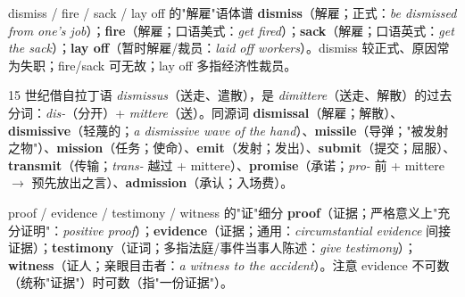 \documentclass[../main.tex]{subfiles}
\begin{document}





\begin{gram}{dismiss / fire / sack / lay off 的"解雇"语体谱}
\textbf{dismiss}（解雇；正式：\textit{be dismissed from one's job}）；\textbf{fire}（解雇；口语美式：\textit{get fired}）；\textbf{sack}（解雇；口语英式：\textit{get the sack}）；\textbf{lay off}（暂时解雇/裁员：\textit{laid off workers}）。dismiss 较正式、原因常为失职；fire/sack 可无故；lay off 多指经济性裁员。
\end{gram}

\begin{origin}
15 世纪借自拉丁语 \textit{dismissus}（送走、遣散），是 \textit{dimittere}（送走、解散）的过去分词：\textit{dis-}（分开）+ \textit{mittere}（送）。同源词 \textbf{dismissal}（解雇；解散）、\textbf{dismissive}（轻蔑的；\textit{a dismissive wave of the hand}）、\textbf{missile}（导弹；"被发射之物"）、\textbf{mission}（任务；使命）、\textbf{emit}（发射；发出）、\textbf{submit}（提交；屈服）、\textbf{transmit}（传输；\textit{trans-} 越过 + mittere）、\textbf{promise}（承诺；\textit{pro-} 前 + mittere $\to$ 预先放出之言）、\textbf{admission}（承认；入场费）。
\end{origin}



\begin{gram}{proof / evidence / testimony / witness 的"证"细分}
\textbf{proof}（证据；严格意义上"充分证明"：\textit{positive proof}）；\textbf{evidence}（证据；通用：\textit{circumstantial evidence} 间接证据）；\textbf{testimony}（证词；多指法庭/事件当事人陈述：\textit{give testimony}）；\textbf{witness}（证人；亲眼目击者：\textit{a witness to the accident}）。注意 evidence 不可数（统称"证据"）时可数（指"一份证据"）。
\end{gram}
\end{document}
